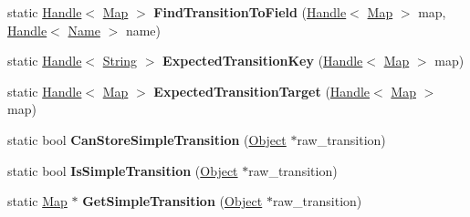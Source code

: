 \begin{DoxyCompactItemize}
\item 
static \hyperlink{classv8_1_1internal_1_1_handle}{Handle}$<$ \hyperlink{classv8_1_1internal_1_1_map}{Map} $>$ {\bfseries Find\+Transition\+To\+Field} (\hyperlink{classv8_1_1internal_1_1_handle}{Handle}$<$ \hyperlink{classv8_1_1internal_1_1_map}{Map} $>$ map, \hyperlink{classv8_1_1internal_1_1_handle}{Handle}$<$ \hyperlink{classv8_1_1internal_1_1_name}{Name} $>$ name)\hypertarget{classv8_1_1internal_1_1_transition_array_ac26e0901c14293f5564b0c614c174bb2}{}\label{classv8_1_1internal_1_1_transition_array_ac26e0901c14293f5564b0c614c174bb2}

\item 
static \hyperlink{classv8_1_1internal_1_1_handle}{Handle}$<$ \hyperlink{classv8_1_1internal_1_1_string}{String} $>$ {\bfseries Expected\+Transition\+Key} (\hyperlink{classv8_1_1internal_1_1_handle}{Handle}$<$ \hyperlink{classv8_1_1internal_1_1_map}{Map} $>$ map)\hypertarget{classv8_1_1internal_1_1_transition_array_ac66a1a27c50f84469b14c0c7002ac231}{}\label{classv8_1_1internal_1_1_transition_array_ac66a1a27c50f84469b14c0c7002ac231}

\item 
static \hyperlink{classv8_1_1internal_1_1_handle}{Handle}$<$ \hyperlink{classv8_1_1internal_1_1_map}{Map} $>$ {\bfseries Expected\+Transition\+Target} (\hyperlink{classv8_1_1internal_1_1_handle}{Handle}$<$ \hyperlink{classv8_1_1internal_1_1_map}{Map} $>$ map)\hypertarget{classv8_1_1internal_1_1_transition_array_a41e6bcb4e4dda79c35f253ab2d9d166a}{}\label{classv8_1_1internal_1_1_transition_array_a41e6bcb4e4dda79c35f253ab2d9d166a}

\item 
static bool {\bfseries Can\+Store\+Simple\+Transition} (\hyperlink{classv8_1_1internal_1_1_object}{Object} $\ast$raw\+\_\+transition)\hypertarget{classv8_1_1internal_1_1_transition_array_af22c83d77488201524cbb60339eca4c1}{}\label{classv8_1_1internal_1_1_transition_array_af22c83d77488201524cbb60339eca4c1}

\item 
static bool {\bfseries Is\+Simple\+Transition} (\hyperlink{classv8_1_1internal_1_1_object}{Object} $\ast$raw\+\_\+transition)\hypertarget{classv8_1_1internal_1_1_transition_array_ab5a626034580087528e7abfd3a301fe5}{}\label{classv8_1_1internal_1_1_transition_array_ab5a626034580087528e7abfd3a301fe5}

\item 
static \hyperlink{classv8_1_1internal_1_1_map}{Map} $\ast$ {\bfseries Get\+Simple\+Transition} (\hyperlink{classv8_1_1internal_1_1_object}{Object} $\ast$raw\+\_\+transition)\hypertarget{classv8_1_1internal_1_1_transition_array_a3940d256fe4be5fced56c0a8a57900b4}{}\label{classv8_1_1internal_1_1_transition_array_a3940d256fe4be5fced56c0a8a57900b4}


\end{DoxyCompactItemize}
